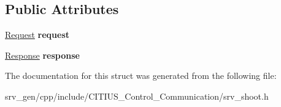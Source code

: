 \subsection*{\-Public \-Attributes}
\begin{DoxyCompactItemize}
\item 
\hypertarget{struct_c_i_t_i_u_s___control___communication_1_1srv__shoot_a3e4af4d64462c4da8db248bf2f8c99d9}{\hyperlink{struct_c_i_t_i_u_s___control___communication_1_1srv__shoot_request__}{\-Request} {\bfseries request}}\label{struct_c_i_t_i_u_s___control___communication_1_1srv__shoot_a3e4af4d64462c4da8db248bf2f8c99d9}

\item 
\hypertarget{struct_c_i_t_i_u_s___control___communication_1_1srv__shoot_a85a721a4846404ecbb02c9c0498f338e}{\hyperlink{struct_c_i_t_i_u_s___control___communication_1_1srv__shoot_response__}{\-Response} {\bfseries response}}\label{struct_c_i_t_i_u_s___control___communication_1_1srv__shoot_a85a721a4846404ecbb02c9c0498f338e}

\end{DoxyCompactItemize}


\-The documentation for this struct was generated from the following file\-:\begin{DoxyCompactItemize}
\item 
srv\-\_\-gen/cpp/include/\-C\-I\-T\-I\-U\-S\-\_\-\-Control\-\_\-\-Communication/srv\-\_\-shoot.\-h\end{DoxyCompactItemize}
